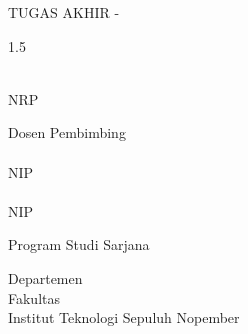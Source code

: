 \begin{large}
  TUGAS AKHIR - \coursecode{}
\end{large}

\vspace{\fill}

\begin{spacing}{1.5}
  \begin{Large}
    \tatitle{}
  \end{Large}
\end{spacing}

\vspace{\fill}

\begin{large}
  \name{} \\
  \textmd{NRP \nrp{}}
\end{large}

\vspace{\fill}

\begin{large}
  \textmd{Dosen Pembimbing} \\
  \advisor{} \\
  \textmd{NIP \advisornip{}} \\
  \coadvisor{} \\
  \textmd{NIP \coadvisornip{}}
\end{large}

\vspace{\fill}

Program Studi Sarjana \studyprogram{} \\

\mdseries

Departemen \department{} \\
Fakultas \faculty{} \\
Institut Teknologi Sepuluh Nopember

\place{} \\ \the\year{}
